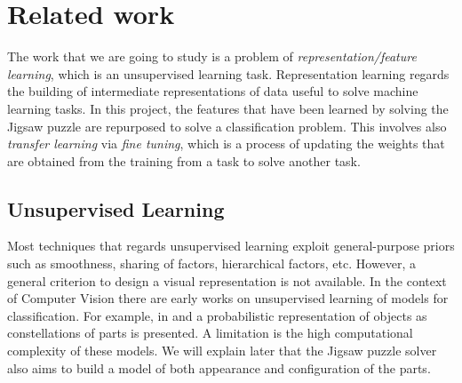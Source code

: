 \section{Related work}
The work that we are going to study is a problem of \emph{representation/feature learning}, which is an unsupervised learning task. Representation learning regards the building of intermediate representations of data useful to solve machine learning tasks. In this project, the features that have been learned by solving the Jigsaw puzzle are repurposed to solve a classification problem. This involves also \emph{transfer learning} via \emph{fine tuning}, which is a process of updating the weights that are obtained from the training from a task to solve another task.

\subsection{Unsupervised Learning}
Most techniques that regards unsupervised learning exploit general-purpose priors such as smoothness, sharing of factors, hierarchical factors, etc. However, a general criterion to design a visual representation is not available. In the context of Computer Vision there are early works on unsupervised learning of models for classification. For example, in \cite{unsupervised_scale_invariant_learning} and \cite{unsupervised_learning_model_recognition} a probabilistic representation of objects as constellations of parts is presented. A limitation is the high computational complexity of these models. We will explain later that the Jigsaw puzzle solver also aims to build a model of both appearance and configuration of the parts.

